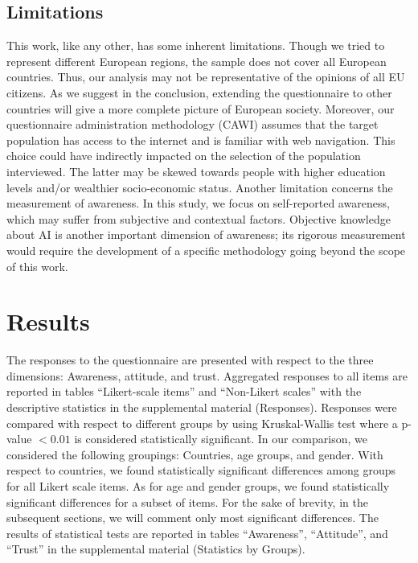 \documentclass{article}
\begin{document}
\subsection*{Limitations}
This work, like any other, has some inherent  limitations. Though we tried to represent different European regions, the sample does not cover all European countries. Thus, our analysis may not be representative of the opinions of all EU citizens. As we suggest in the conclusion, extending the questionnaire to other countries will give a more complete picture of European society. Moreover, our questionnaire administration methodology (CAWI) assumes that the target population has access to the internet and is familiar with web navigation. This choice could have indirectly impacted on the selection of the population interviewed. The latter may be skewed towards people with higher education levels and/or wealthier socio-economic status.  Another limitation concerns the measurement of awareness. In this study, we focus on self-reported awareness, which may suffer from subjective and contextual factors. Objective knowledge about AI is another important dimension of awareness; its rigorous measurement would require the development of a specific methodology going beyond the scope of this work.

\section{Results} \label{results}%

The responses to the questionnaire are presented with respect to the three dimensions: Awareness, attitude, and trust. Aggregated responses to all items are reported in tables ``Likert-scale items'' and ``Non-Likert scales'' with the descriptive statistics in the supplemental material (Responses).
Responses were compared with respect to different groups by using Kruskal-Wallis test where a p-value $< 0.01$ is considered statistically significant. In our comparison, we considered the following groupings: Countries, age groups, and gender. With respect to countries, we found statistically significant differences among groups for all Likert scale items. As for age and gender groups, we found statistically significant differences for a subset of items. For the sake of brevity, in the subsequent sections, we will comment only most significant differences. The results of statistical tests are reported in tables ``Awareness'', ``Attitude'', and ``Trust'' in the supplemental material (Statistics by Groups).
\end{document}
